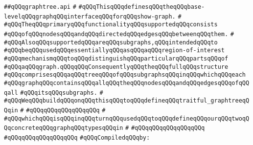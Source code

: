 \label{src/lib/std/graphtree/graphtree.api}
\verb|##qQQqgraphtree.api|\newline
\verb|#|\newline
\verb|#qQQqThisqQQqdefinesqQQqtheqQQqbase-levelqQQqgraphqQQqinterfaceqQQqforqQQqshow-graph.|\newline
\verb|#|\newline
\verb|#qQQqTheqQQqprimaryqQQqfunctionalityqQQqsupportedqQQqconsists|\newline
\verb|#qQQqofqQQqnodesqQQqandqQQqdirectedqQQqedgesqQQqbetweenqQQqthem.|\newline
\verb|#|\newline
\verb|#qQQqAlsoqQQqsupportedqQQqareqQQqsubgraphs,qQQqintendedqQQqto|\newline
\verb|#qQQqbeqQQqusedqQQqessentiallyqQQqasqQQqaqQQqregion-of-interest|\newline
\verb|#qQQqmechanismqQQqtoqQQqdistinguishqQQqparticularqQQqpartsqQQqof|\newline
\verb|#qQQqaqQQqgraph.qQQqqQQqConsequentlyqQQqtheqQQqfullqQQqstructure|\newline
\verb|#qQQqcomprisesqQQqaqQQqtreeqQQqofqQQqsubgraphsqQQqinqQQqwhichqQQqeach|\newline
\verb|#qQQqgraphqQQqcontainsqQQqallqQQqtheqQQqnodesqQQqandqQQqedgesqQQqofqQQqall|\newline
\verb|#qQQqitsqQQqsubgraphs.|\newline
\verb|#|\newline
\verb|#qQQqWeqQQqbuildqQQqonqQQqthisqQQqtoqQQqdefineqQQqtraitful_graphtreeqQQqin|\newline
\verb|#|\newline
\verb|#qQQqqQQqqQQqqQQqqQQq|\newline
\verb|#|\newline
\verb|#qQQqwhichqQQqisqQQqinqQQqturnqQQqusedqQQqtoqQQqdefineqQQqourqQQqtwoqQQqconcreteqQQqgraphqQQqtypesqQQqin|\newline
\verb|#|\newline
\verb|#qQQqqQQqqQQqqQQqqQQq|\newline
\verb|#qQQqqQQqqQQqqQQqqQQq|\newline
\newline
\verb|#qQQqCompiledqQQqby:|\newline
